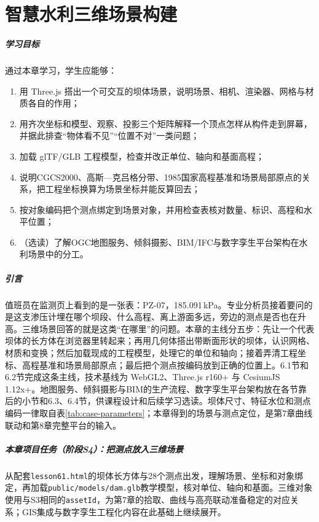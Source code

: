 \chapter{智慧水利三维场景构建}

\paragraph*{学习目标}

通过本章学习，学生应能够：
\begin{enumerate}
\item 用 Three.js 搭出一个可交互的坝体场景，说明场景、相机、渲染器、网格与材质各自的作用；
\item 用齐次坐标和模型、观察、投影三个矩阵解释一个顶点怎样从构件走到屏幕，并据此排查“物体看不见”“位置不对”一类问题；
\item 加载 glTF/GLB 工程模型，检查并改正单位、轴向和基面高程；
\item 说明CGCS2000、高斯—克吕格分带、1985国家高程基准和场景局部原点的关系，把工程坐标换算为场景坐标并能反算回去；
\item 按对象编码把\cpStationCount 个测点绑定到场景对象，并用检查表核对数量、标识、高程和水平位置；
\item （选读）了解OGC地图服务、倾斜摄影、BIM/IFC与数字孪生平台架构在水利场景中的分工。
\end{enumerate}

\paragraph*{引言}

值班员在监测页上看到的是一张表：PZ-07，185.091\,kPa。专业分析员接着要问的是这支渗压计埋在哪个坝段、什么高程、离上游面多远，旁边的测点是否也在升高。三维场景回答的就是这类“在哪里”的问题。本章的主线分五步：先让一个代表坝体的长方体在浏览器里转起来；再用几何体搭出带断面形状的坝体，认识网格、材质和变换；然后加载现成的工程模型，处理它的单位和轴向；接着弄清工程坐标、高程基准和场景局部原点；最后把\cpStationCount 个测点按编码放到正确的位置上。6.1节和6.2节完成这条主线，技术基线为 WebGL2、Three.js r160+ 与 CesiumJS 1.12x+。地图服务、倾斜摄影与BIM的生产流程、数字孪生平台架构放在各节靠后的小节和6.3、6.4节，供课程设计和后续学习选读。坝体尺寸、特征水位和测点编码一律取自表\ref{tab:case-parameters}；本章得到的场景与测点定位，是第7章曲线联动和第8章完整平台的输入。

\begin{tipbox}
\paragraph{本章项目任务（阶段S4）：把测点放入三维场景}从配套\texttt{lesson61.html}的坝体长方体与28个测点出发，理解场景、坐标和对象绑定，再加载\texttt{public/models/dam.glb}教学模型，核对单位、轴向和基面。三维对象使用与S3相同的\texttt{assetId}，为第7章的拾取、曲线与高亮联动准备稳定的对应关系；GIS集成与数字孪生工程化内容在此基础上继续展开。

\end{tipbox}

